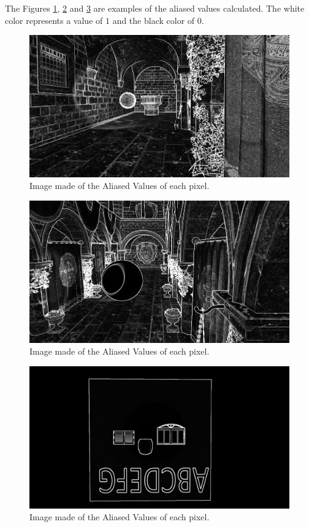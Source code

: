 \documentclass{cslthse-msc}
\begin{document}
The Figures \ref{fig:aliasedval1}, \ref{fig:aliasedval2} and \ref{fig:aliasedval3} are examples of the aliased values calculated. The white color represents a value of $1$ and the black color of $0$.

\begin{figure}[H]
	\centering
	\includegraphics[scale=0.2]{images/aliased_value_example_1_temporal.png}
	\caption{Image made of the Aliased Values of each pixel.}\label{fig:aliasedval1}
\end{figure}

\begin{figure}[H]
	\centering
	\includegraphics[scale=0.2]{images/aliased_value_example_2_temporal.png}
	\caption{Image made of the Aliased Values of each pixel.}\label{fig:aliasedval2}
\end{figure}

\begin{figure}[H]
	\centering
	\includegraphics[scale=0.2]{images/aliased_value_example_3_temporal.png}
	\caption{Image made of the Aliased Values of each pixel.}\label{fig:aliasedval3}
\end{figure}
\end{document}
